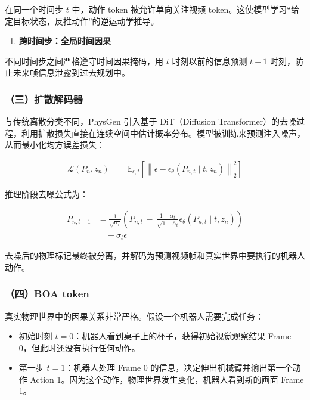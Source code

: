 在同一个时间步 \(t\) 中，动作 token 被允许单向关注视频 token。这使模型学习``给定目标状态，反推动作''的逆运动学推导。

\begin{enumerate}
\def\labelenumi{\arabic{enumi}.}
\setcounter{enumi}{3}
\tightlist
\item
  \textbf{跨时间步：全局时间因果}
\end{enumerate}

不同时间步之间严格遵守时间因果掩码，用 \(t\) 时刻以前的信息预测 \(t+1\) 时刻，防止未来帧信息泄露到过去规划中。

\hypertarget{ux4e09ux6269ux6563ux89e3ux7801ux5668}{%
\subsubsection{（三）扩散解码器}\label{ux4e09ux6269ux6563ux89e3ux7801ux5668}}

与传统离散分类不同，PhysGen 引入基于 DiT（Diffusion Transformer）的去噪过程，利用扩散损失直接在连续空间中估计概率分布。模型被训练来预测注入噪声，从而最小化均方误差损失：

\[
\begin{aligned}
\mathcal{L}(P_n, z_n)
&= \mathbb{E}_{\epsilon,t}
\left[
\left\|
\epsilon - \epsilon_\theta(P_{n,t}\mid t,z_n)
\right\|_2^2
\right]
\end{aligned}
\]

推理阶段去噪公式为：

\[
\begin{aligned}
P_{n,t-1}
&=
\frac{1}{\sqrt{\alpha_t}}
\left(
P_{n,t}
\, - \, \frac{1-\alpha_t}{\sqrt{1-\bar{\alpha}_t}}
\epsilon_\theta(P_{n,t}\mid t,z_n)
\right)
\\
&\quad + \sigma_t \epsilon
\end{aligned}
\]

去噪后的物理标记最终被分离，并解码为预测视频帧和真实世界中要执行的机器人动作。

\hypertarget{ux56dbboa-token}{%
\subsubsection{（四）BOA token}\label{ux56dbboa-token}}

真实物理世界中的因果关系非常严格。假设一个机器人需要完成任务：

\begin{itemize}
\tightlist
\item
  初始时刻 \(t=0\)：机器人看到桌子上的杯子，获得初始视觉观察结果 Frame 0，但此时还没有执行任何动作。
\item
  第一步 \(t=1\)：机器人处理 Frame 0 的信息，决定伸出机械臂并输出第一个动作 Action 1。因为这个动作，物理世界发生变化，机器人看到新的画面 Frame 1。
\end{itemize}

